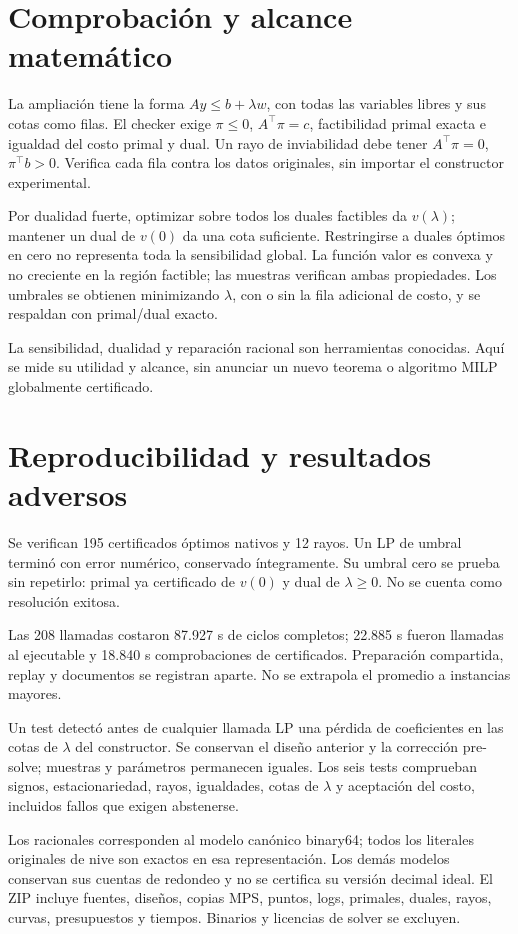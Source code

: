 \documentclass[10pt,a4paper]{article}
\begin{document}
\section*{Comprobación y alcance matemático}
La ampliación tiene la forma $Ay\le b+\lambda w$, con todas las variables
libres y sus cotas como filas. El checker exige $\pi\le0$, $A^\top\pi=c$,
factibilidad primal exacta e igualdad del costo primal y dual. Un rayo de
inviabilidad debe tener $A^\top\pi=0$, $\pi^\top b>0$. Verifica cada fila
contra los datos originales, sin importar el constructor experimental.

Por dualidad fuerte, optimizar sobre todos los duales factibles da $v(\lambda)$;
mantener un dual de $v(0)$ da una cota suficiente. Restringirse a duales
óptimos en cero no representa toda la sensibilidad global. La función valor
es convexa y no creciente en la región factible; las muestras verifican ambas
propiedades. Los umbrales se obtienen minimizando $\lambda$, con o sin la
fila adicional de costo, y se respaldan con primal/dual exacto.

La sensibilidad, dualidad y reparación racional son herramientas conocidas.
Aquí se mide su utilidad y alcance, sin anunciar un nuevo teorema o algoritmo
MILP globalmente certificado.
\newpage
\section*{Reproducibilidad y resultados adversos}

Se verifican 195 certificados óptimos nativos y 12 rayos.
Un LP de umbral terminó con error numérico, conservado íntegramente. Su
umbral cero se prueba sin repetirlo: primal ya certificado de $v(0)$ y dual
de $\lambda\ge0$. No se cuenta como resolución exitosa.

Las 208 llamadas costaron 87.927 s de ciclos completos; 22.885 s
fueron llamadas al ejecutable y 18.840 s comprobaciones de certificados.
Preparación compartida, replay y documentos se registran aparte. No se
extrapola el promedio a instancias mayores.

Un test detectó antes de cualquier llamada LP una pérdida de coeficientes
en las cotas de $\lambda$ del constructor. Se conservan el diseño anterior y
la corrección pre-solve; muestras y parámetros permanecen iguales. Los
seis tests comprueban signos, estacionariedad, rayos, igualdades, cotas de
$\lambda$ y aceptación del costo, incluidos fallos que exigen abstenerse.

Los racionales corresponden al modelo canónico binary64; todos los literales
originales de nive son exactos en esa representación. Los demás modelos
conservan sus cuentas de redondeo y no se certifica su versión decimal ideal.
El ZIP incluye fuentes, diseños, copias MPS, puntos, logs, primales, duales,
rayos, curvas, presupuestos y tiempos. Binarios y licencias de solver se excluyen.
\end{document}
